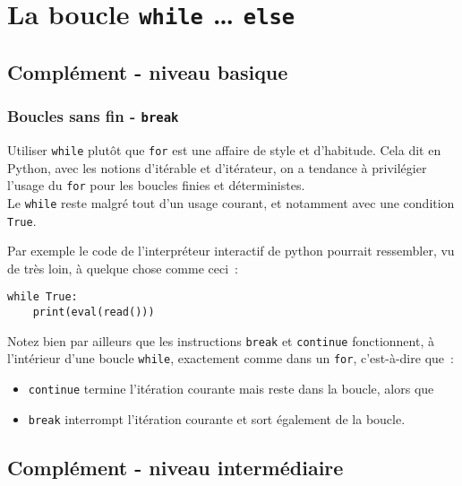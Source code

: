     \hypertarget{la-boucle-while-else}{%
\section{\texorpdfstring{La boucle \texttt{while} \ldots{}
\texttt{else}}{La boucle while \ldots{} else}}\label{la-boucle-while-else}}

    \hypertarget{compluxe9ment---niveau-basique}{%
\subsection{Complément - niveau
basique}\label{compluxe9ment---niveau-basique}}

    \hypertarget{boucles-sans-fin---break}{%
\subsubsection{\texorpdfstring{Boucles sans fin -
\texttt{break}}{Boucles sans fin - break}}\label{boucles-sans-fin---break}}

    Utiliser \texttt{while} plutôt que \texttt{for} est une affaire de style
et d'habitude. Cela dit en Python, avec les notions d'itérable et
d'itérateur, on a tendance à privilégier l'usage du \texttt{for} pour
les boucles finies et déterministes.\\

    Le \texttt{while} reste malgré tout d'un usage courant, et notamment
avec une condition \texttt{True}.

Par exemple le code de l'interpréteur interactif de python pourrait
ressembler, vu de très loin, à quelque chose comme ceci~:

\begin{verbatim}
while True:
    print(eval(read()))
\end{verbatim}

    Notez bien par ailleurs que les instructions \texttt{break} et
\texttt{continue} fonctionnent, à l'intérieur d'une boucle
\texttt{while}, exactement comme dans un \texttt{for}, c'est-à-dire
que~:

\begin{itemize}
	\item 
	\texttt{continue} termine l'itération courante mais reste dans
	la boucle, alors que
	\item
	\texttt{break} interrompt l'itération courante et
	sort également de la boucle.
\end{itemize}

    \hypertarget{compluxe9ment---niveau-intermuxe9diaire}{%
\subsection{Complément - niveau
intermédiaire}\label{compluxe9ment---niveau-intermuxe9diaire}}

